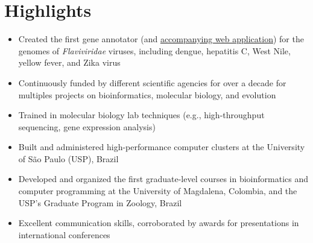 
\vspace{-2.5em}



\section{Highlights}

    \begin{itemize}
        \item Created the first gene annotator (and \href{http://flavi-web.com/}{accompanying web application}) for the genomes of \textit{Flaviviridae} viruses, including dengue, hepatitis C, West Nile, yellow fever, and Zika virus
        \item Continuously funded by different scientific agencies for over a decade for multiples projects on bioinformatics, molecular biology, and evolution
        \item Trained in molecular biology lab techniques (e.g., high-throughput sequencing, gene expression analysis)
        \item Built and administered high-performance computer clusters at the University of São Paulo (USP), Brazil
        \item Developed and organized the first graduate-level courses in bioinformatics and computer programming at the University of Magdalena, Colombia, and the USP's Graduate Program in Zoology, Brazil
        \item Excellent communication skills, corroborated by awards for presentations in international conferences
    \end{itemize}
